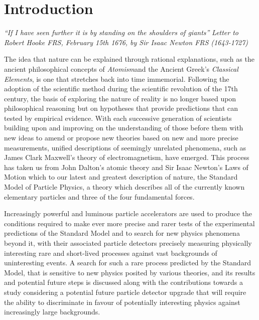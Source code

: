 \chapter{Introduction}\label{chapter:intro}

\emph{``If I have seen further it is by standing on the shoulders of giants''}
\emph{Letter to Robert Hooke FRS, February 15th 1676, by Sir Isaac Newton FRS (1643-1727)}

The idea that nature can be explained through rational explanations, such as the ancient philosophical concepts of \emph{Atomism}and the Ancient Greek's \emph{Classical Elements}, is one that stretches back into time immemorial.
Following the adoption of the scientific method during the scientific revolution of the 17th century, the basis of  exploring the nature of reality is no longer based upon philosophical reasoning but on hypotheses that provide predictions that can tested by empirical evidence.
With each successive generation of scientists building upon and improving on the understanding of those before them with new ideas to amend or propose new theories based on new and more precise measurements, unified descriptions of seemingly unrelated phenomena, such as James Clark Maxwell's theory of electromagnetism, have emerged.
This process has taken us from John Dalton's atomic theory and Sir Isaac Newton's Laws of Motion which to our latest and greatest description of nature, the Standard Model of Particle Physics, a theory which describes all of the currently known elementary particles and three of the four fundamental forces.

Increasingly powerful and luminous particle accelerators are used to produce the conditions required to make ever more precise and rarer tests of the experimental predictions of the Standard Model and to search for new physics phenomena beyond it, with their associated particle detectors precisely measuring physically interesting rare and short-lived processes against vast backgrounds of uninteresting events.
A search for such a rare process predicted by the Standard Model, that is sensitive to new physics posited by various theories, and its results and potential future steps is discussed along with the contributions towards a study considering a potential future particle detector upgrade that will require the ability to discriminate in favour of potentially interesting physics against increasingly large backgrounds.